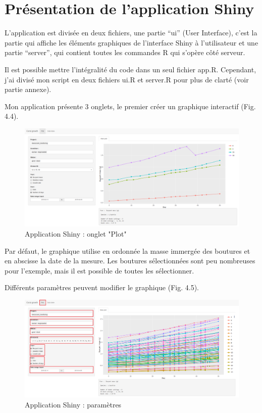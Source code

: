 \documentclass[]{report}
\begin{document}
\section{Présentation de l'application
Shiny}\label{presentation-de-lapplication-shiny}

L'application est divisée en deux fichiers, une partie ``ui'' (User
Interface), c'est la partie qui affiche les éléments graphiques de
l'interface Shiny à l'utilisateur et une partie ``server'', qui contient
toutes les commandes R qui s'opère côté serveur.

Il est possible mettre l'intégralité du code dans un seul fichier app.R.
Cependant, j'ai divisé mon script en deux fichiers ui.R et server.R pour
plus de clarté (voir partie annexe).

\vspace{1 cm}

Mon application présente 3 onglets, le premier créer un graphique
interactif (Fig. 4.4).

\begin{figure}[h!]
\includegraphics[]{../image/notebook-plot1.PNG}
\caption{Application Shiny : onglet "Plot"}
\end{figure}

\vspace{0.5 cm}

Par défaut, le graphique utilise en ordonnée la masse immergée des
boutures et en abscisse la date de la mesure. Les boutures sélectionnées
sont peu nombreuses pour l'exemple, mais il est possible de toutes les
sélectionner.

\vspace{0.5 cm}

Différents paramètres peuvent modifier le graphique (Fig. 4.5).

\begin{figure}
\centering
\includegraphics[width=15.00000cm]{../image/notebook-plot2.PNG}
\caption{Application Shiny : paramètres}
\end{figure}
\end{document}
